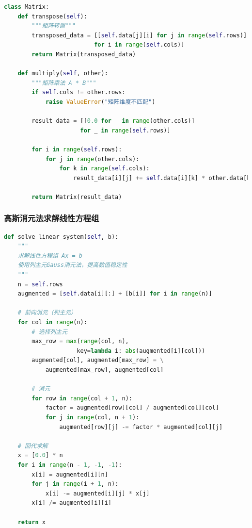 \documentclass[a4paper,12pt]{article}
\theoremstyle{definition}
\begin{document}
\begin{lstlisting}[language=Python,caption={矩阵类的关键方法}]
class Matrix:
    def transpose(self):
        """矩阵转置"""
        transposed_data = [[self.data[j][i] for j in range(self.rows)]
                          for i in range(self.cols)]
        return Matrix(transposed_data)
    
    def multiply(self, other):
        """矩阵乘法 A * B"""
        if self.cols != other.rows:
            raise ValueError("矩阵维度不匹配")
        
        result_data = [[0.0 for _ in range(other.cols)]
                      for _ in range(self.rows)]
        
        for i in range(self.rows):
            for j in range(other.cols):
                for k in range(self.cols):
                    result_data[i][j] += self.data[i][k] * other.data[k][j]
        
        return Matrix(result_data)
\end{lstlisting}

\subsubsection{高斯消元法求解线性方程组}

\begin{lstlisting}[language=Python,caption={高斯消元法（列主元选取）}]
def solve_linear_system(self, b):
    """
    求解线性方程组 Ax = b
    使用列主元Gauss消元法，提高数值稳定性
    """
    n = self.rows
    augmented = [self.data[i][:] + [b[i]] for i in range(n)]
    
    # 前向消元（列主元）
    for col in range(n):
        # 选择列主元
        max_row = max(range(col, n), 
                     key=lambda i: abs(augmented[i][col]))
        augmented[col], augmented[max_row] = \
            augmented[max_row], augmented[col]
        
        # 消元
        for row in range(col + 1, n):
            factor = augmented[row][col] / augmented[col][col]
            for j in range(col, n + 1):
                augmented[row][j] -= factor * augmented[col][j]
    
    # 回代求解
    x = [0.0] * n
    for i in range(n - 1, -1, -1):
        x[i] = augmented[i][n]
        for j in range(i + 1, n):
            x[i] -= augmented[i][j] * x[j]
        x[i] /= augmented[i][i]
    
    return x
\end{lstlisting}
\end{document}
